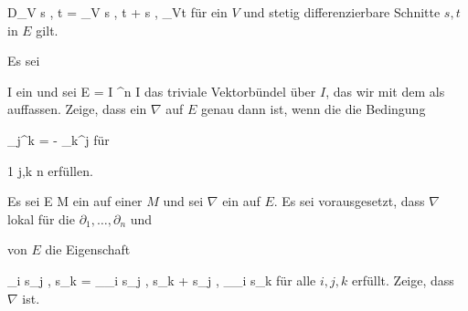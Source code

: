 \mavergleichskettedisp
{\vergleichskette
{ D_V \left\langle  s  , t  \right\rangle
}
{ =} { \left\langle \nabla_V s , t  \right\rangle  + \left\langle  s  ,  \nabla_Vt  \right\rangle
}
{ } {
}
{ } {
}
{ } {
}
}
{}{}{}
für ein
$V$ und stetig differenzierbare Schnitte $s,t$ in $E$ gilt.

{}
{

Es sei

\mavergleichskette
{\vergleichskette
{ I
}
{ \subseteq }{ \R
}
{  }{
}
{    }{
}
{   }{
}
}
{}{}{}
ein
und sei
 {E = I \times \R^n } { I
} {}
das triviale Vektorbündel über $I$, das wir mit dem
als
auffassen. Zeige, dass ein
$\nabla$ auf $E$ genau dann
ist, wenn die
die Bedingung
 {} {}

\mavergleichskettedisp
{\vergleichskette
{ \Gamma_j^k
}
{ =} { - \Gamma_k^j
}
{ } {
}
{ } {
}
{ } {
}
}
{}{}{}
für

\mavergleichskette
{\vergleichskette
{ 1
}
{ \leq }{ j,k
}
{ \leq }{ n
}
{    }{
}
{   }{
}
}
{}{}{}
erfüllen.

}
{} {}

{}
{

Es sei
 { E } { M
} {}
ein
auf einer
$M$ und sei $\nabla$ ein
auf $E$. Es sei vorausgesetzt, dass $\nabla$ lokal für die
$\partial_1  , \ldots , \partial_n$ und

 von $E$ die Eigenschaft

\mavergleichskettedisp
{\vergleichskette
{ \partial_i \left\langle  s_j  , s_k   \right\rangle
}
{ =} { \left\langle \nabla_{\partial_i } s_j   ,  s_k   \right\rangle  + \left\langle s_j  ,  \nabla_{\partial_i } s_k    \right\rangle
}
{ } {
}
{ } {
}
{ } {
}
}
{}{}{}
für alle $i,j,k$ erfüllt. Zeige, dass $\nabla$
ist.

}
{} {}

